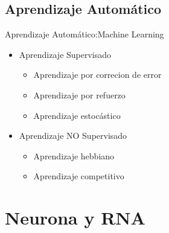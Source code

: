 \documentclass{beamer}
\begin{document}
\subsection{Aprendizaje Automático}
\begin{frame}{Aprendizaje Automático:}{Machine Learning}
\begin{itemize}
\item {Aprendizaje Supervisado\pause}
\begin{itemize}
\item {Aprendizaje por correcion de error\pause}
\item {Aprendizaje por refuerzo\pause}
\item {Aprendizaje estocástico\pause}
\end{itemize}
\item {Aprendizaje NO Supervisado\pause}
\begin{itemize}
\item {Aprendizaje hebbiano\pause}
\item {Aprendizaje competitivo}
\end{itemize}
\end{itemize}
\end{frame}

\section{Neurona y RNA}
\end{document}
